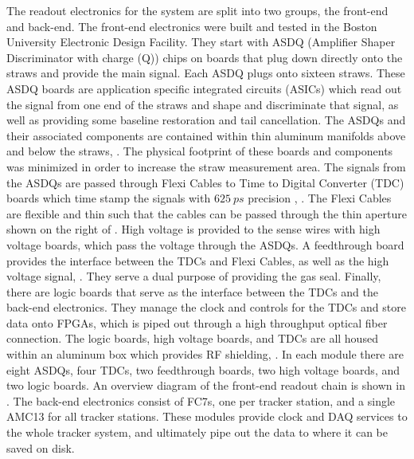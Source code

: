 The readout electronics for the system are split into two groups, the front-end and back-end. The front-end electronics were built and tested in the Boston University Electronic Design Facility. They start with ASDQ (Amplifier Shaper Discriminator with charge (Q)) chips on boards that plug down directly onto the straws and provide the main signal. Each ASDQ plugs onto sixteen straws. These ASDQ boards are application specific integrated circuits (ASICs) which read out the signal from one end of the straws and shape and discriminate that signal, as well as providing some baseline restoration and tail cancellation. The ASDQs and their associated components are contained within thin aluminum manifolds above and below the straws, . The physical footprint of these boards and components was minimized in order to increase the straw measurement area. The signals from the ASDQs are passed through Flexi Cables to Time to Digital Converter (TDC) boards which time stamp the signals with $\SI{625}{ps}$ precision \cite{WTThesis}, . The Flexi Cables are flexible and thin such that the cables can be passed through the thin aperture shown on the right of . High voltage is provided to the sense wires with high voltage boards, which pass the voltage through the ASDQs. A feedthrough board provides the interface between the TDCs and Flexi Cables, as well as the high voltage signal, . They serve a dual purpose of providing the gas seal. Finally, there are logic boards that serve as the interface between the TDCs and the back-end electronics. They manage the clock and controls for the TDCs and store data onto FPGAs, which is piped out through a high throughput optical fiber connection. The logic boards, high voltage boards, and TDCs are all housed within an aluminum box which provides RF shielding, . In each module there are eight ASDQs, four TDCs, two feedthrough boards, two high voltage boards, and two logic boards. An overview diagram of the front-end readout chain is shown in . The back-end electronics consist of FC7s, one per tracker station, and a single AMC13 for all tracker stations. These modules provide clock and DAQ services to the whole tracker system, and ultimately pipe out the data to where it can be saved on disk.


